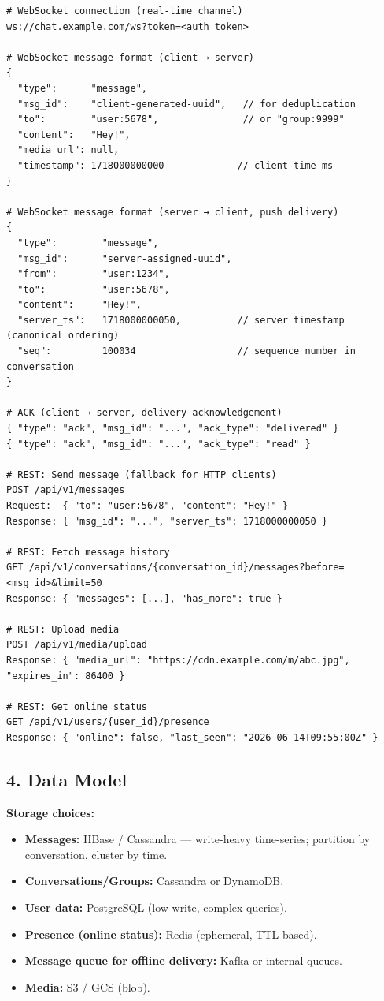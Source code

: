 \documentclass[11pt]{article}
\providecommand{\tightlist}{\setlength{\itemsep}{1pt}\setlength{\parskip}{0pt}}
\begin{document}
\setcodelang{}

\begin{verbatim}
# WebSocket connection (real-time channel)
ws://chat.example.com/ws?token=<auth_token>

# WebSocket message format (client → server)
{
  "type":      "message",
  "msg_id":    "client-generated-uuid",   // for deduplication
  "to":        "user:5678",               // or "group:9999"
  "content":   "Hey!",
  "media_url": null,
  "timestamp": 1718000000000             // client time ms
}

# WebSocket message format (server → client, push delivery)
{
  "type":        "message",
  "msg_id":      "server-assigned-uuid",
  "from":        "user:1234",
  "to":          "user:5678",
  "content":     "Hey!",
  "server_ts":   1718000000050,          // server timestamp (canonical ordering)
  "seq":         100034                  // sequence number in conversation
}

# ACK (client → server, delivery acknowledgement)
{ "type": "ack", "msg_id": "...", "ack_type": "delivered" }
{ "type": "ack", "msg_id": "...", "ack_type": "read" }

# REST: Send message (fallback for HTTP clients)
POST /api/v1/messages
Request:  { "to": "user:5678", "content": "Hey!" }
Response: { "msg_id": "...", "server_ts": 1718000000050 }

# REST: Fetch message history
GET /api/v1/conversations/{conversation_id}/messages?before=<msg_id>&limit=50
Response: { "messages": [...], "has_more": true }

# REST: Upload media
POST /api/v1/media/upload
Response: { "media_url": "https://cdn.example.com/m/abc.jpg", "expires_in": 86400 }

# REST: Get online status
GET /api/v1/users/{user_id}/presence
Response: { "online": false, "last_seen": "2026-06-14T09:55:00Z" }
\end{verbatim}

\subsection{4. Data Model}\label{4-data-model-3}

\textbf{Storage choices:}

\begin{itemize}
\tightlist
\item
  \textbf{Messages:} HBase / Cassandra --- write-heavy time-series; partition by conversation, cluster by time.
\item
  \textbf{Conversations/Groups:} Cassandra or DynamoDB.
\item
  \textbf{User data:} PostgreSQL (low write, complex queries).
\item
  \textbf{Presence (online status):} Redis (ephemeral, TTL-based).
\item
  \textbf{Message queue for offline delivery:} Kafka or internal queues.
\item
  \textbf{Media:} S3 / GCS (blob).
\end{itemize}
\end{document}
